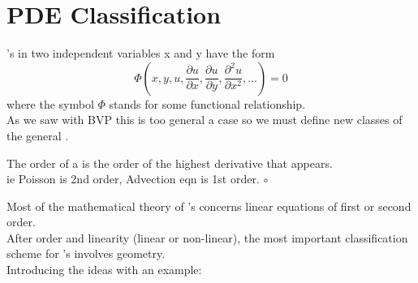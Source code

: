 \section{PDE Classification}
's in two independent variables x and y have the form
\[ \Phi\left(x,y,u,\frac{\partial u}{\partial x},\frac{\partial u}{\partial y},\frac{\partial^2 u}{\partial x^2},...\right) = 0 \]
where the symbol $\Phi$ stands for some functional relationship.\\
As we saw with BVP this is too general a case so we must define new classes of the
general .
\begin{definition}
The order of a  is the order of the highest derivative that appears.\\
ie Poisson is 2nd order, Advection eqn is 1st order. $\circ$
\end{definition}
Most of the mathematical theory of 's concerns linear equations of first or second order.\\
After order and linearity (linear or non-linear), the most important classification
scheme for 's involves geometry.\\
Introducing the ideas with an example:\\
